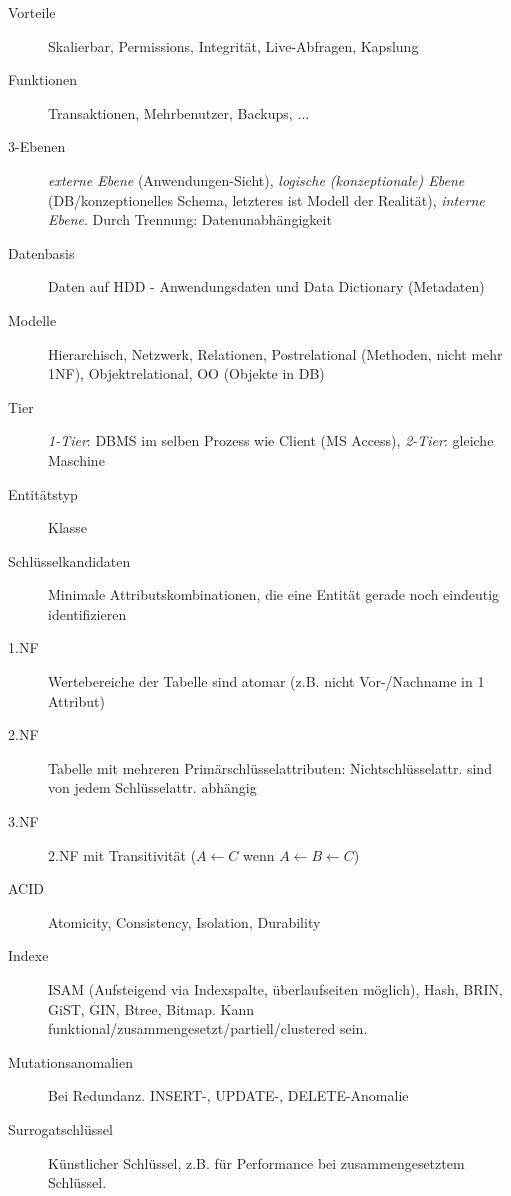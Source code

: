 \documentclass[10pt,landscape,a4paper]{article}
\begin{document}
\begin{multicols*}{3}
\begin{description}
\item[Vorteile]{Skalierbar, Permissions, Integrität, Live-Abfragen, Kapslung}
\item[Funktionen]{Transaktionen, Mehrbenutzer, Backups, $\ldots$}
\item[3-Ebenen]{\emph{externe Ebene} (Anwendungen-Sicht), \emph{logische (konzeptionale) Ebene}
    (DB/konzeptionelles Schema, letzteres ist Modell der Realität), \emph{interne
    Ebene}. Durch Trennung: Datenunabhängigkeit}
\item[Datenbasis]{Daten auf HDD - Anwendungsdaten und Data Dictionary (Metadaten)}
\item[Modelle]{Hierarchisch, Netzwerk, Relationen, Postrelational (Methoden,
    nicht mehr 1NF), Objektrelational, OO (Objekte in DB)}
\item[Tier]{\emph{1-Tier}: DBMS im selben Prozess wie Client (MS Access), \emph{2-Tier}:
    gleiche Maschine}
\item[Entitätstyp]{Klasse}
\item[Schlüsselkandidaten]{Minimale Attributskombinationen, die eine Entität
    gerade noch eindeutig identifizieren}
\item[1.NF]{Wertebereiche der Tabelle sind atomar (z.B. nicht Vor-/Nachname in 1 Attribut)}
\item[2.NF]{Tabelle mit mehreren Primärschlüsselattributen: Nichtschlüsselattr. sind
    von jedem Schlüsselattr. abhängig}
\item[3.NF]{2.NF mit Transitivität ($A \leftarrow C$ wenn $A \leftarrow B \leftarrow C$)}
\item[ACID]{Atomicity, Consistency, Isolation, Durability}
\item[Indexe]{ISAM (Aufsteigend via Indexspalte, überlaufseiten möglich), Hash, BRIN, GiST, GIN, Btree, Bitmap. Kann funktional/zusammengesetzt/partiell/clustered sein.}
\item[Mutationsanomalien]{Bei Redundanz. INSERT-, UPDATE-, DELETE-Anomalie}
\item[Surrogatschlüssel]{Künstlicher Schlüssel, z.B. für Performance bei
    zusammengesetztem Schlüssel}.
\end{description}


\end{multicols*}
\end{document}
